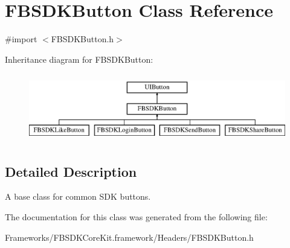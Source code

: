 \hypertarget{interface_f_b_s_d_k_button}{}\section{F\+B\+S\+D\+K\+Button Class Reference}
\label{interface_f_b_s_d_k_button}


{\ttfamily \#import $<$F\+B\+S\+D\+K\+Button.\+h$>$}

Inheritance diagram for F\+B\+S\+D\+K\+Button\+:\begin{figure}[H]
\begin{center}
\leavevmode
\includegraphics[height=3.000000cm]{interface_f_b_s_d_k_button}
\end{center}
\end{figure}


\subsection{Detailed Description}
A base class for common S\+D\+K buttons. 

The documentation for this class was generated from the following file\+:\begin{DoxyCompactItemize}
\item 
Frameworks/\+F\+B\+S\+D\+K\+Core\+Kit.\+framework/\+Headers/F\+B\+S\+D\+K\+Button.\+h\end{DoxyCompactItemize}
